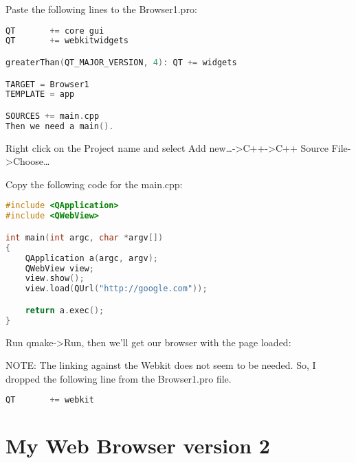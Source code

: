 \begin{figure}[htbp]
\centering
{}
\caption{}
\end{figure}

Paste the following lines to the Browser1.pro:

\begin{lstlisting}[language=c++, numbers=none]
QT       += core gui
QT       += webkitwidgets

greaterThan(QT_MAJOR_VERSION, 4): QT += widgets

TARGET = Browser1
TEMPLATE = app

SOURCES += main.cpp
Then we need a main().
\end{lstlisting}

Right click on the Project name and select Add
new\ldots{}-\textgreater{}C++-\textgreater{}C++ Source
File-\textgreater{}Choose\ldots{}





Copy the following code for the main.cpp:

\begin{lstlisting}[language=c++, numbers=none]
#include <QApplication>
#include <QWebView>

int main(int argc, char *argv[])
{
    QApplication a(argc, argv);
    QWebView view;
    view.show();
    view.load(QUrl("http://google.com"));

    return a.exec();
}
\end{lstlisting}

Run qmake-\textgreater{}Run, then we'll get our browser with the page
loaded:

\begin{figure}[htbp]
\centering
{}
\caption{}
\end{figure}

NOTE: The linking against the Webkit does not seem to be needed. So, I
dropped the following line from the Browser1.pro file.

\begin{lstlisting}[language=c++, numbers=none]
QT       += webkit
\end{lstlisting}

\section{My Web Browser version 2}\label{my-web-browser-version-2}

